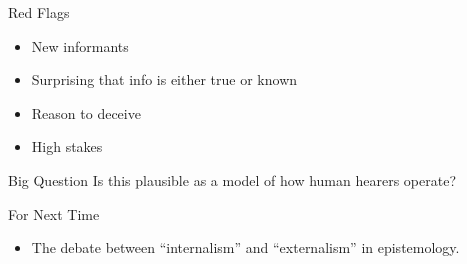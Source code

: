 \documentclass[
  17pt,
  letterpaper,
  ignorenonframetext,
  aspectratio=169,
  handout]{beamer}
\providecommand{\tightlist}{%
  \setlength{\itemsep}{0pt}\setlength{\parskip}{0pt}}\usepackage{longtable,booktabs,array}
\begin{document}
\begin{frame}{Red Flags}
\protect\hypertarget{red-flags}{}
\begin{itemize}[<+->]
\tightlist
\item
  New informants
\item
  Surprising that info is either true or known
\item
  Reason to deceive
\item
  High stakes
\end{itemize}
\end{frame}

\begin{frame}{Big Question}
\protect\hypertarget{big-question}{}
Is this plausible as a model of how human hearers operate?
\end{frame}

\begin{frame}{For Next Time}
\protect\hypertarget{for-next-time}{}
\begin{itemize}[<+->]
\tightlist
\item
  The debate between ``internalism'' and ``externalism'' in
  epistemology.
\end{itemize}
\end{frame}
\end{document}
